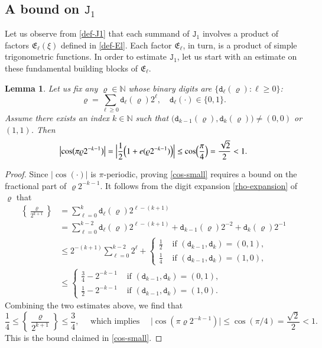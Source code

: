 \documentclass[12pt, twoside]{article}
\newtheorem{lemma}[theorem]{Lemma}
\theoremstyle{definition}
\numberwithin{equation}{section}
\begin{document}
\subsection{A bound on $\mathtt J_1$} 
Let us observe from \eqref{def-J1} that each summand of $\mathtt J_1$ involves a product of factors $\mathfrak E_{\ell}(\xi)$ defined in \eqref{def-El}. Each factor $\mathfrak E_{\ell}$, in turn, is a product of simple trigonometric functions. In order to estimate $\mathtt J_1$, let us start with an estimate on these fundamental building blocks of  $\mathfrak E_{\ell}$. 
\begin{lemma} \label{cos-lemma}
Let us fix any $\varrho \in \mathbb N$ whose binary digits are $\{\mathtt d_{\ell}(\varrho): \ell \geq 0\}$: 
\begin{equation} \label{rho-expansion}   
\varrho = \sum_{\ell \geq 0} \mathtt d_\ell(\varrho) 2^{\ell}, \quad \mathtt d_{\ell}(\cdot) \in \{0,1\}. 
\end{equation} 
Assume there exists an index $k \in \mathbb N$ such that $ \bigl(\mathtt d_{k-1}(\varrho), \mathtt d_k(\varrho) \bigr) \ne (0,0)$ or $(1,1)$. Then  
\begin{equation} \label{cos-small}
\bigl| \cos \bigl(\pi \varrho 2^{-k-1}\bigr) \bigr| = \Bigl| \frac{1}{2} \Bigl(1 + e(\varrho 2^{-k-1})\Bigr) \Bigr| \leq \cos \Bigl(\frac{\pi}{4}\Bigr) = \frac{\sqrt{2}}{2}<1.   
\end{equation} 
\end{lemma} 
\begin{proof} 
Since $|\cos(\cdot)|$ is $\pi$-periodic, proving \eqref{cos-small} requires a bound on the fractional part of $\varrho 2^{-k-1}$. It follows from the digit expansion \eqref{rho-expansion} of $\varrho$ that  
\begin{align*} 
\left\{ \frac{\varrho}{2^{k+1}} \right\}  &= \sum_{\ell=0}^k \mathtt d_{\ell}(\varrho) 2^{\ell - (k+1)}  \\ 
&= \sum_{\ell=0}^{k-2} \mathtt d_{\ell}(\varrho) 2^{\ell - (k+1)} + \mathtt d_{k-1}(\varrho) 2^{-2} + \mathtt d_k(\varrho) 2^{-1} \\ 
&\leq 2^{-(k+1)} \sum_{\ell=0}^{k-2} 2^{\ell} + \begin{cases} \frac{1}{2} &\text{ if } (\mathtt d_{k-1}, \mathtt d_k) = (0,1), \\ 
\frac{1}{4} &\text{ if }  (\mathtt d_{k-1}, \mathtt d_k) = (1,0),
 \end{cases}  \\
 &\leq \begin{cases}
 \frac{3}{4} - 2^{-k-1} &\text{ if }  (\mathtt d_{k-1}, \mathtt d_k) = (0,1), \\ 
 \frac{1}{2} - 2^{-k-1} &\text{ if }  (\mathtt d_{k-1}, \mathtt d_k) = (1,0).
 \end{cases} 
\end{align*} 
Combining the two estimates above, we find that 
\[ \frac{1}{4} \leq \left\{ \frac{\varrho}{2^{k+1}} \right\} \leq \frac{3}{4}, \quad \text{ which implies } \quad \bigl|\cos(\pi \varrho 2^{-k-1})\bigr| \leq \cos(\pi/4) = \frac{\sqrt{2}}{2} < 1. \] 
This is the bound claimed in \eqref{cos-small}.
\end{proof} 
\end{document}
